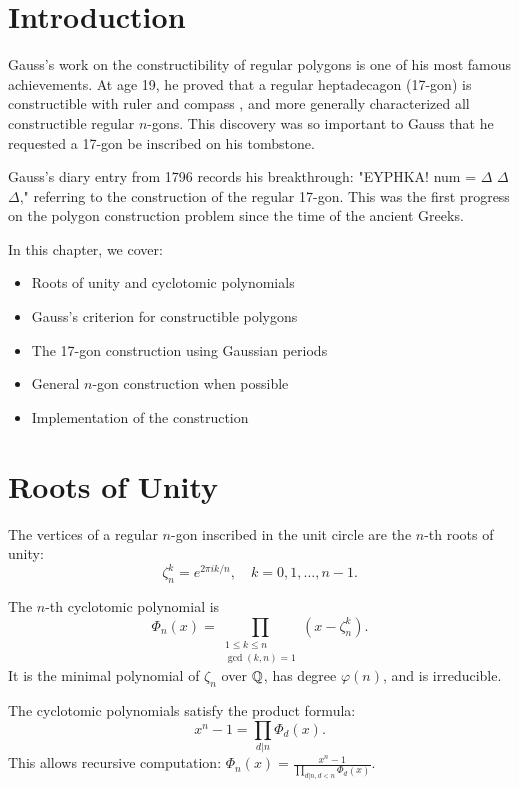 \section{Introduction}

Gauss's work on the constructibility of regular polygons is one of his most famous achievements. At age 19, he proved that a regular heptadecagon  (17-gon) is constructible  with ruler and compass , and more generally characterized all constructible regular $n$-gons. This discovery was so important to Gauss that he requested a 17-gon be inscribed on his tombstone.

Gauss's diary entry from 1796 records his breakthrough: "EYPHKA! num = $\Delta$ $\Delta$ $\Delta$," referring to the construction of the regular 17-gon. This was the first progress on the polygon construction problem since the time of the ancient Greeks.

In this chapter, we cover:
\begin{itemize}
    \item Roots of unity and cyclotomic polynomials
    \item Gauss's criterion for constructible polygons
    \item The 17-gon construction using Gaussian periods 
    \item General $n$-gon construction when possible
    \item Implementation of the construction
\end{itemize}

\section{Roots of Unity}

The vertices of a regular $n$-gon inscribed in the unit circle are the $n$-th roots of unity:
\[
\zeta_n^k = e^{2\pi i k / n}, \quad k = 0, 1, \ldots, n-1.
\]

\begin{definition}
The $n$-th cyclotomic polynomial is
\[
\Phi_n(x) = \prod_{\substack{1 \le k \le n \\ \gcd(k,n)=1}} (x - \zeta_n^k).
\]
It is the minimal polynomial of $\zeta_n$ over $\mathbb{Q}$, has degree $\varphi(n)$, and is irreducible.
\end{definition}

The cyclotomic polynomials satisfy the product formula:
\[
x^n - 1 = \prod_{d|n} \Phi_d(x).
\]
This allows recursive computation: $\Phi_n(x) = \frac{x^n - 1}{\prod_{d|n, d<n} \Phi_d(x)}$.

